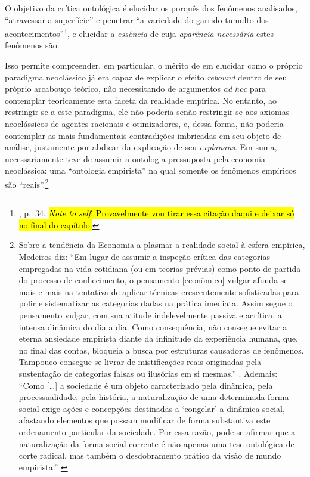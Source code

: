 O objetivo da crítica ontológica é elucidar os porquês dos fenômenos analisados, ``atravessar a superfície'' e penetrar ``a variedade do garrido tumulto dos acontecimentos''\footnote{\textcite{Hegel1995}, p.~34. \hl{\textit{Note to self}: Provavelmente vou tirar essa citação daqui e deixar só no final do capítulo.}}, e elucidar a \emph{essência} de cuja \emph{aparência necessária} estes fenômenos são.

Isso permite compreender, em particular, o mérito de \textcite{Khazzoom1980,Khazzoom1987} em elucidar como o próprio paradigma neoclássico já era capaz de explicar o efeito \emph{rebound} dentro de seu próprio arcabouço teórico, não necessitando de argumentos \emph{ad hoc} para contemplar teoricamente esta faceta da realidade empírica. No entanto, ao restringir-se a este paradigma, ele não poderia senão restringir-se aos axiomas neoclássicos de agentes racionais e otimizadores, e, dessa forma, não poderia contemplar as mais fundamentais contradições imbricadas em seu objeto de análise, justamente por abdicar da explicação de seu \emph{explanans}. Em suma, necessariamente teve de assumir a ontologia pressuposta pela economia neoclássica: uma ``ontologia empirista'' na qual somente os fenômenos empíricos são ``reais''.\footnote{Sobre a tendência da Economia a plasmar a realidade social à esfera empírica, Medeiros diz: ``Em lugar de assumir a inspeção crítica das categorias empregadas na vida cotidiana (ou em teorias prévias) como ponto de partida do processo de conhecimento, o pensamento {[}econômico{]} vulgar afunda-se mais e mais na tentativa de aplicar técnicas crescentemente sofisticadas para polir e sistematizar as categorias dadas na prática imediata. Assim segue o pensamento vulgar, com sua atitude indelevelmente passiva e acrítica, a intensa dinâmica do dia a dia. Como consequência, não consegue evitar a eterna ansiedade empirista diante da infinitude da experiência humana, que, no final das contas, bloqueia a busca por estruturas causadoras de fenômenos. Tampouco consegue se livrar de mistificações reais originadas pela sustentação de categorias falsas ou ilusórias em si mesmas.'' \parencite[p. 66]{Medeiros2013}. Ademais: ``Como {[}\ldots{]} a sociedade é um objeto caracterizado pela dinâmica, pela processualidade, pela história, a naturalização de uma determinada forma social exige ações e concepções destinadas a `congelar' a dinâmica social, afastando elementos que possam modificar de forma substantiva este ordenamento particular da sociedade. Por essa razão, pode-se afirmar que a naturalização da forma social corrente é não apenas uma tese ontológica de corte radical, mas também o desdobramento prático da visão de mundo empirista.'' \parencite[p. 102]{Medeiros2013}}


